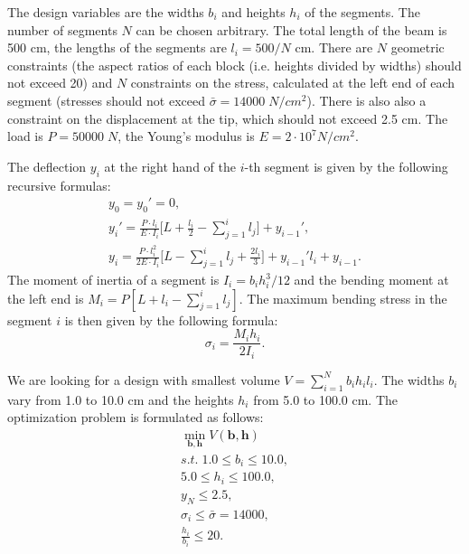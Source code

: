 \documentclass{llncs}
\begin{document}
The design variables are the widths $b_i$ and heights $h_i$ of the segments. The number of segments $N$ can be chosen arbitrary. The total length of the beam is 500 cm, the lengths of the segments are $l_i=500/N$  cm. There are $N$ geometric constraints (the aspect ratios of each block (i.e. heights divided by widths) should not exceed 20) and $N$ constraints on the stress, calculated at the left end of each segment (stresses should not exceed  $\bar{\sigma}=14000\; N/cm^2$). There is also also a constraint on the displacement at the tip, which should not exceed 2.5 cm. The load is $P = 50 000\; N$, the Young's modulus is $E=2\cdot 10^7  N/cm^2$.

The deflection $y_i$ at the right hand of the $i$-th segment is given by the following recursive formulas:
\begin{displaymath}
  \begin{array}{c}
    y_0=y_0'=0, \\
    y_i'=\frac{P\cdot l_i}{E\cdot I_i}\Big[ L+\frac{l_i}{2}-\sum\limits_{j=1}^i l_j\Big]+y_{i-1}', \\
    y_i=\frac{P\cdot l_i^2}{2E\cdot I_i}\Big[L-\sum\limits_{j=1}^i l_j + \frac{2l_i}{3}\Big]+y_{i-1}'l_i+y_{i-1}.
  \end{array}
\end{displaymath}
The moment of inertia of a segment is $I_i=b_i h_i^3 / 12$ and the bending moment at the left end is $M_i=P[L+l_i- \sum_{j=1}^{i}  l_j ]$. The maximum bending stress in the segment $i$ is then given by the following formula:
\begin{displaymath}
  \sigma_i=\frac{M_i h_i}{2I_i}.
\end{displaymath}

We are looking for a design with smallest volume $V = \sum_{i=1}^N b_i h_i l_i$. The widths $b_i$ vary from 1.0 to 10.0 cm and the heights $h_i$ from 5.0 to 100.0 cm. The optimization problem is formulated as follows:
\begin{displaymath}
  \begin{array}{c}
    \min\limits_{\boldsymbol b, \boldsymbol h}V(\boldsymbol b, \boldsymbol h) \\
    s.t.\;1.0\le b_i \le 10.0, \\
    5.0 \le h_i \le 100.0, \\
    y_N\le 2.5, \\
    \sigma_i \le \bar{\sigma}=14000, \\
    \frac{h_i}{b_i}\le 20.
  \end{array}
\end{displaymath}
\end{document}

